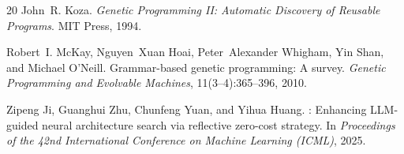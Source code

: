 \documentclass{article}
\begin{document}
\begin{thebibliography}{20}
John~R. Koza.
\newblock \textit{Genetic Programming {II}: Automatic Discovery of Reusable Programs}.
\newblock MIT Press, 1994.

Robert~I. McKay, Nguyen~Xuan Hoai, Peter~Alexander Whigham, Yin Shan, and Michael O'Neill.
\newblock Grammar-based genetic programming: A survey.
\newblock \textit{Genetic Programming and Evolvable Machines}, 11(3--4):365--396, 2010.

Zipeng Ji, Guanghui Zhu, Chunfeng Yuan, and Yihua Huang.
: Enhancing {LLM}-guided neural architecture search via reflective zero-cost strategy.
\newblock In \textit{Proceedings of the 42nd International Conference on Machine Learning (ICML)}, 2025.

\end{thebibliography}
\end{document}
